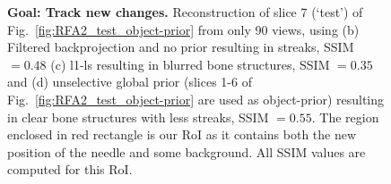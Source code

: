 \documentclass[journal]{IEEEtran}
\begin{document}
\begin{figure}[!h]
\caption[Representative results-1]{\textbf{Goal: Track new changes.}\small{ Reconstruction of slice 7 (`test') of Fig.~\ref{fig:RFA2_test_object-prior} from only 90 views, using (b) Filtered backprojection and no prior resulting in streaks, SSIM $= 0.48$ (c) l1-ls resulting in blurred bone structures, SSIM $=0.35$ and (d) unselective global prior (slices 1-6 of Fig.~\ref{fig:RFA2_test_object-prior} are used as object-prior) resulting in clear bone structures with less streaks, SSIM $=0.55$. The region enclosed in red rectangle is our RoI as it contains both the new position of the needle and some background. All SSIM values are computed for this RoI.}}
\label{fig:RFA2_very_few_views}
\end{figure}


\begin{figure}[!h]
\centering
{}\hfill
{}\hfill
{}\hfill
{}

\end{figure}
\end{document}
